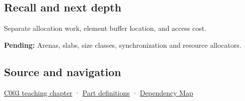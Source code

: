 \subsection{Recall and next depth}\label{appendix-c3480f7d9ff3-recall-and-next-depth}

Separate allocation work, element buffer location, and access cost.

\textbf{Pending:} Arenas, slabs, size classes, synchronization and resource allocators.

\subsection{Source and navigation}\label{appendix-c3480f7d9ff3-source-and-navigation}

\hyperref[01-foundations-i-ch002-where-the-bytes-live]{C003 teaching chapter} · \hyperref[appendix-fd090d982a15-m003---parts-41-60]{Part definitions} · \hyperref[appendix-4ad47bdd269a]{Dependency Map}
